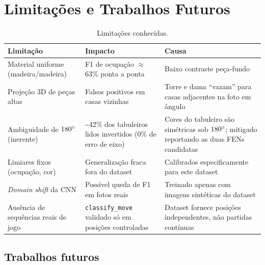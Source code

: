 \section{Limitações e Trabalhos Futuros}
\label{sec:limitacoes}

\begin{table}[H]
\centering
\caption{Limitações conhecidas.}
\begin{tabular}{@{}p{4cm}p{4.5cm}p{5cm}@{}}
\toprule
Limitação & Impacto & Causa \\
\midrule
Material uniforme (madeira/madeira) & F1 de ocupação $\approx$ 63\% ponta a ponta & Baixo contraste peça-fundo \\
Projeção 3D de peças altas & Falsos positivos em casas vizinhas & Torre e dama ``vazam'' para casas adjacentes na foto em ângulo \\
Ambiguidade de $180\degree$ (inerente) & \textasciitilde42\% dos tabuleiros lidos invertidos (0\% de erro de eixo) & Cores do tabuleiro são simétricas sob $180\degree$; mitigado reportando as duas FENs candidatas \\
Limiares fixos (ocupação, cor) & Generalização fraca fora do dataset & Calibrados especificamente para este dataset \\
\textit{Domain shift} da CNN & Possível queda de F1 em fotos reais & Treinado apenas com imagens sintéticas do dataset \\
Ausência de sequências reais de jogo & \texttt{classify\_move} validado só em posições controladas & Dataset fornece posições independentes, não partidas contínuas \\
\bottomrule
\end{tabular}
\end{table}

\subsection{Trabalhos futuros}

